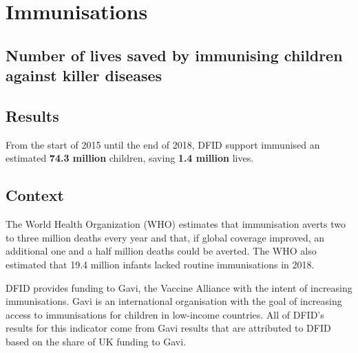 \chapter{Immunisations}

\section*{Number of lives saved by immunising children against killer diseases}


\thispagestyle{empty}



\section{Results}
From the start of 2015 until the end of 2018, DFID support immunised an estimated \textbf{
74.3
million} children, saving \textbf{
1.4
million} lives. %



\section{Context}

The World Health Organization (WHO) estimates that immunisation averts two to three million deaths every year and that, if global coverage improved, an additional one and a half million deaths could be averted. %
The WHO also estimated that 19.4 million infants lacked routine immunisations in 2018\footnotemark. \\%


DFID provides funding to Gavi, the Vaccine Alliance with the intent of increasing immunisations. %
Gavi is an international organisation with the goal of increasing access to immunisations for children in low-income countries. %
All of DFID's results for this indicator come from Gavi results that are attributed to DFID based on the share of UK funding to Gavi. %

\newpage
